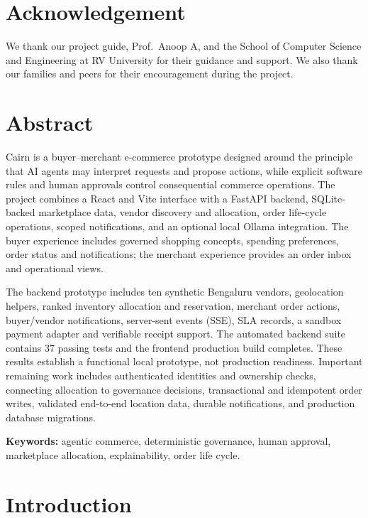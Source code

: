 \documentclass[12pt,a4paper]{report}
\begin{document}
\chapter*{Acknowledgement}
We thank our project guide, Prof.\ Anoop A, and the School of Computer Science
and Engineering at RV University for their guidance and support. We also thank
our families and peers for their encouragement during the project.

\chapter*{Abstract}
Cairn is a buyer--merchant e-commerce prototype designed around the principle
that AI agents may interpret requests and propose actions, while explicit
software rules and human approvals control consequential commerce operations.
The project combines a React and Vite interface with a FastAPI backend,
SQLite-backed marketplace data, vendor discovery and allocation, order
life-cycle operations, scoped notifications, and an optional local Ollama
integration. The buyer experience includes governed shopping concepts,
spending preferences, order status and notifications; the merchant experience
provides an order inbox and operational views.

The backend prototype includes ten synthetic Bengaluru vendors, geolocation
helpers, ranked inventory allocation and reservation, merchant order actions,
buyer/vendor notifications, server-sent events (SSE), SLA records, a sandbox
payment adapter and verifiable receipt support. The automated backend suite
contains 37 passing tests and the frontend production build completes. These
results establish a functional local prototype, not production readiness.
Important remaining work includes authenticated identities and ownership
checks, connecting allocation to governance decisions, transactional and
idempotent order writes, validated end-to-end location data, durable
notifications, and production database migrations.

\textbf{Keywords:} agentic commerce, deterministic governance, human approval,
marketplace allocation, explainability, order life cycle.

\tableofcontents
\listoffigures
\listoftables
\clearpage
{}

\chapter{Introduction}
\end{document}
